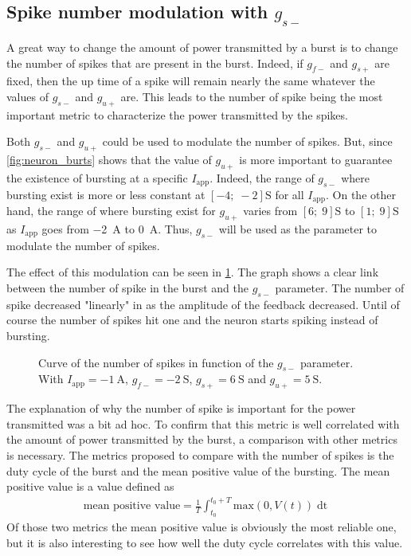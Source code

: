 \subsection{Spike number modulation with $g_{s-}$}\label{sec:spike_mod}

A great way to change the amount of power transmitted by a burst is to change the number of spikes that are present in the burst. 
Indeed, if $g_{f-}$ and $g_{s+}$ are fixed, then the up time of a spike will remain nearly the same whatever the values of $g_{s-}$ and $g_{u+}$ are. 
This leads to the number of spike being the most important metric to characterize the power transmitted by the spikes. 

Both $g_{s-}$ and $g_{u+}$ could be used to modulate the number of spikes. 
But, since \cref{fig:neuron_burts} shows that the value of $g_{u+}$ is more important to guarantee the existence of bursting at a specific $I_\text{app}$.
Indeed, the range of $g_{s-}$ where bursting exist is more or less constant at $\left[-4;\;-2\right]\unit{\siemens}$ for all $I_\text{app}$.
On the other hand, the range of where bursting exist for $g_{u+}$ varies from $\left[6;\;9\right]\unit{\siemens}$ to $\left[1;\;9\right]\unit{\siemens}$ as $I_\text{app}$ goes from \qty{-2}{\ampere} to \qty{0}{\ampere}.
Thus, $g_{s-}$ will be used as the parameter to modulate the number of spikes.

The effect of this modulation can be seen in \cref{fig:neuron_burst_spikes}. 
The graph shows a clear link between the number of spike in the burst and the $g_{s-}$ parameter. 
The number of spike decreased "linearly" in as the amplitude of the feedback decreased.
Until of course the number of spikes hit one and the neuron starts spiking instead of bursting.

\begin{figure}[!htb]
    \centering
    \caption{Curve of the number of spikes in function of the $g_{s-}$ parameter. With $I_\text{app} = \qty{-1}{\ampere}$, $g_{f-} = \qty{-2}{\siemens}$, $g_{s+} = \qty{6}{\siemens}$ and $g_{u+} = \qty{5}{\siemens}$.}
    \label{fig:neuron_burst_spikes}
\end{figure}

The explanation of why the number of spike is important for the power transmitted was a bit ad hoc. 
To confirm that this metric is well correlated with the amount of power transmitted by the burst, a comparison with other metrics is necessary. 
The metrics proposed to compare with the number of spikes is the duty cycle of the burst and the mean positive value of the bursting. 
The mean positive value is a value defined as 
\begin{align}
    \text{mean positive value} = \frac{1}{T}\int_{t_0}^{t_0+T} \text{max}\left(0, V(t)\right) \mathop{\mathrm{d}t} 
\end{align}
Of those two metrics the mean positive value is obviously the most reliable one, but it is also interesting to see how well the duty cycle correlates with this value.

